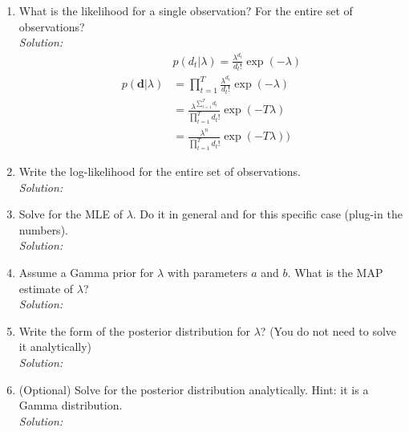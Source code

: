 \documentclass[12pt,a4paper]{article}
\begin{document}
\begin{enumerate}
  \item What is the likelihood for a single observation?  For the entire set of observations? \\
	  \emph{Solution:} \\
		  \begin{align*}
		  	&p(d_t\vert \lambda) = \frac{\lambda^{d_t}}{d_t!}\exp(-\lambda) \\
		  	p(\textbf{d} \vert \lambda)&=\prod_{t=1}^{T} \frac{\lambda^{d_t}}{d_t!}\exp(-\lambda) \\
		  	&=\frac{\lambda^{\sum_{t=1}^{T}d_t}}{\prod_{t=1}^{T}d_t!}\exp(-T\lambda) \\
		  	&=\frac{\lambda^{n}}{\prod_{t=1}^{T}d_t!}\exp(-T\lambda))
		  \end{align*}
  
  \item Write the log-likelihood for the entire set of observations. \\
	  \emph{Solution:} \\
  
   
  \item Solve for the MLE of $\lambda$.  Do it in general and for this specific case (plug-in the numbers). \\
  \emph{Solution:} \\
  
  \item Assume a Gamma prior for $\lambda$ with parameters $a$ and $b$.  What is the MAP estimate of $\lambda$? \\
  \emph{Solution:} \\
  
  \item Write the form of the posterior distribution for $\lambda$? (You do not need to solve it analytically) \\
  \emph{Solution:} \\
  
  \item (Optional) Solve for the posterior distribution analytically.  Hint: it is a Gamma distribution. \\
  \emph{Solution:} \\
  
\end{enumerate}
\end{document}
